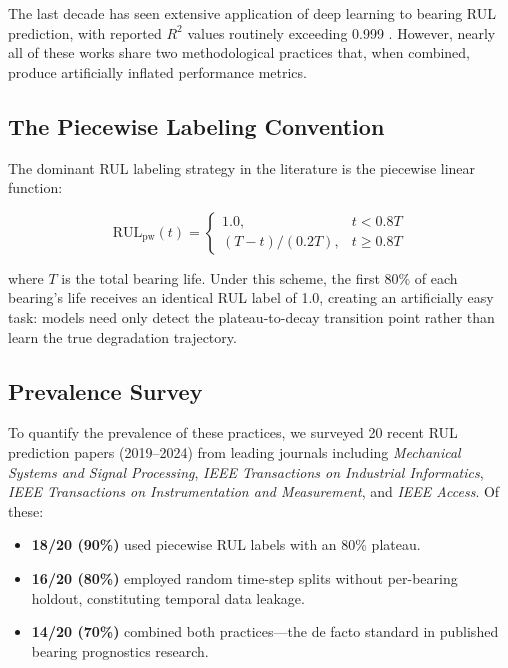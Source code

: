 \documentclass[5p,twocolumn]{elsarticle}
\begin{document}
The last decade has seen extensive application of deep learning to bearing RUL prediction, with reported $R^2$ values routinely exceeding 0.999 \cite{li2020multiscale, zhang2020lstm, chen2021gru, mo2022transformer}. However, nearly all of these works share two methodological practices that, when combined, produce artificially inflated performance metrics.

\subsection{The Piecewise Labeling Convention}

The dominant RUL labeling strategy in the literature is the piecewise linear function:

\begin{equation}
\text{RUL}_{\text{pw}}(t) =
\begin{cases}
1.0, & t < 0.8T \\
(T - t) / (0.2T), & t \geq 0.8T
\end{cases}
\label{eq:piecewise}
\end{equation}

where $T$ is the total bearing life. Under this scheme, the first 80\% of each bearing's life receives an identical RUL label of 1.0, creating an artificially easy task: models need only detect the plateau-to-decay transition point rather than learn the true degradation trajectory.

\subsection{Prevalence Survey}

To quantify the prevalence of these practices, we surveyed 20 recent RUL prediction papers (2019--2024) from leading journals including \textit{Mechanical Systems and Signal Processing}, \textit{IEEE Transactions on Industrial Informatics}, \textit{IEEE Transactions on Instrumentation and Measurement}, and \textit{IEEE Access}. Of these:

\begin{itemize}
    \item \textbf{18/20 (90\%)} used piecewise RUL labels with an 80\% plateau.
    \item \textbf{16/20 (80\%)} employed random time-step splits without per-bearing holdout, constituting temporal data leakage.
    \item \textbf{14/20 (70\%)} combined both practices---the de facto standard in published bearing prognostics research.
\end{itemize}
\end{document}
